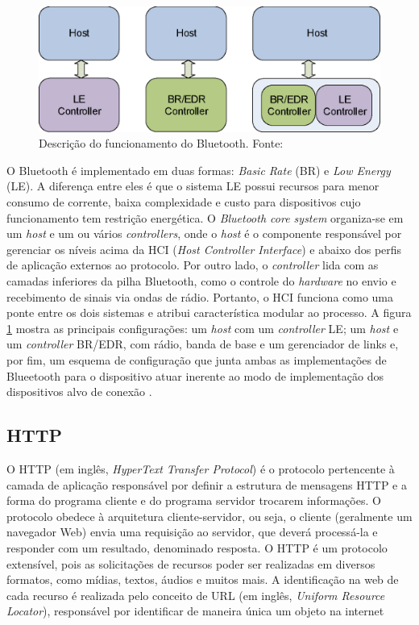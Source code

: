 \begin{figure}[ht]
    \centering
    \includegraphics[width=.48\textwidth]{img/blueetooth-comunication.png}
    \caption{Descrição do funcionamento do Bluetooth. Fonte: \cite{bluetoothDocumentation}}\label{figBluetooth}
\end{figure}

O Bluetooth é implementado em duas formas: \textit{Basic Rate} (BR) e \textit{Low Energy} (LE). A diferença entre eles é que o sistema LE
possui recursos para menor consumo de corrente, baixa complexidade e custo para dispositivos cujo funcionamento tem restrição energética. O \textit{Bluetooth core system} 
organiza-se em um \textit{host} e um ou vários \textit{controllers}, onde o \textit{host} é o componente responsável 
por gerenciar os níveis acima da HCI (\textit{Host Controller Interface}) e abaixo dos perfis de aplicação externos ao protocolo. Por outro lado, o \textit{controller} 
lida com as camadas inferiores da pilha Bluetooth, como o controle do \textit{hardware} no envio e recebimento de sinais via ondas de rádio. Portanto, o 
HCI funciona como uma ponte entre os dois sistemas e atribui característica modular ao processo. A figura \ref{figBluetooth} mostra as principais configurações: um \textit{host} com um \textit{controller} LE; 
um \textit{host} e um \textit{controller} BR/EDR, com rádio, banda de base e um gerenciador de links e, por fim, um esquema de configuração que junta ambas as implementações de Blueetooth para o dispositivo atuar inerente 
ao modo de implementação dos dispositivos alvo de conexão \cite{bluetoothDocumentation}.

\subsection{HTTP}

O HTTP (em inglês, \textit{HyperText Transfer Protocol}) é o protocolo pertencente à camada de aplicação responsável por definir a estrutura de mensagens HTTP e a forma do programa cliente e do programa servidor 
trocarem informações. O protocolo obedece à arquitetura cliente-servidor, ou seja, o cliente (geralmente um navegador Web) envia uma requisição ao servidor, que deverá processá-la e responder com um resultado, denominado resposta. O HTTP é um protocolo extensível, pois 
as solicitações de recursos poder ser realizadas em diversos formatos, como mídias, textos, áudios e muitos mais. A identificação na web de cada recurso é realizada pelo conceito de URL (em inglês, \textit{Uniform Resource Locator}), responsável por identificar de maneira única um objeto na internet \cite[pp. 72]{redeskurose2010}

